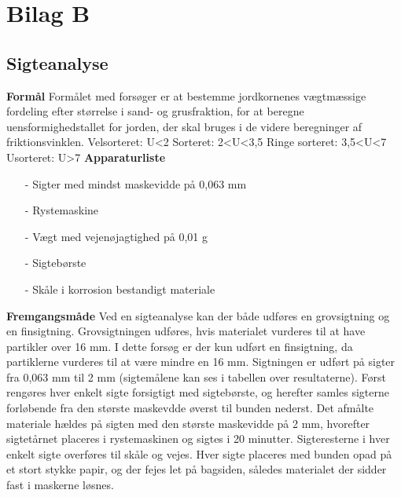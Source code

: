 \chapter{Bilag B}
\section{Sigteanalyse}
\textbf{Formål}
\newline
Formålet med forsøger er at bestemme jordkornenes vægtmæssige fordeling efter størrelse i sand- og grusfraktion, for at beregne uensformighedstallet for jorden, der skal bruges i de videre beregninger af friktionsvinklen. 
\newline
\newline
Velsorteret: U<2
\newline 
Sorteret: 2<U<3,5
\newline
Ringe sorteret: 3,5<U<7
\newline
Usorteret: U>7
\newline
\newline
\textbf{Apparaturliste}
\begin{itemize}
	\item[-] Sigter med mindst maskevidde på 0,063 mm
	\item[-] Rystemaskine
	\item[-] Vægt med vejenøjagtighed på 0,01 g
	\item[-] Sigtebørste
	\item[-] Skåle i korrosion bestandigt materiale
\end{itemize}
\textbf{Fremgangsmåde}
\newline
Ved en sigteanalyse kan der både udføres en grovsigtning og en finsigtning. Grovsigtningen udføres, hvis materialet vurderes til at have partikler over 16 mm. I dette forsøg er der kun udført en finsigtning, da partiklerne vurderes til at være mindre en 16 mm. Sigtningen er udført på sigter fra 0,063 mm til 2 mm (sigtemålene kan ses i tabellen over resultaterne). 
\newline \indent{     }   Først rengøres hver enkelt sigte forsigtigt med sigtebørste, og herefter samles sigterne forløbende fra den største maskevdde øverst til bunden nederst. Det afmålte materiale hældes på sigten med den største maskevidde på 2 mm, hvorefter sigtetårnet placeres i rystemaskinen og sigtes i 20 minutter.
\newline \indent{     }   Sigteresterne i hver enkelt sigte overføres til skåle og vejes. Hver sigte placeres med bunden opad på et stort stykke papir, og der fejes let på bagsiden, således materialet der sidder fast i maskerne løsnes.
